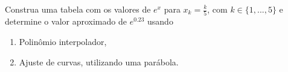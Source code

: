 %
\begin{ex}
Construa uma tabela com os valores de $e^x$ para $x_k=\frac{k}{5}$, com $k\in\{1,...,5\}$ e determine o valor aproximado de $e^{0.23}$ usando
\begin{enumerate}
\item Polinômio interpolador,
\item Ajuste de curvas, utilizando uma parábola.
\end{enumerate} 
\end{ex}




%
%